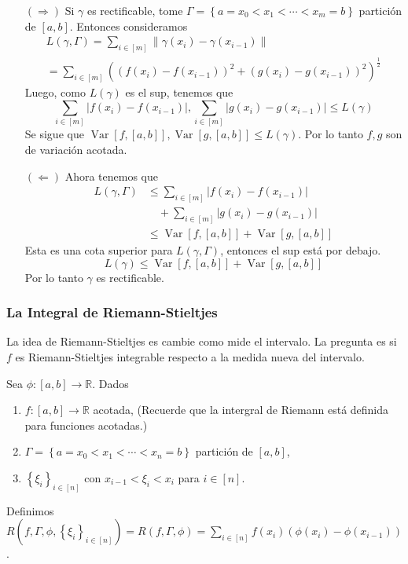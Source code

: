 \documentclass[12pt]{article}
\theoremstyle{plain}
\theoremstyle{definition}
\theoremstyle{remark}
\numberwithin{equation}{section}
\DeclareMathOperator{\Var}{Var}     %
\newcommand{\bR}{\mathbb{R}}        %
\renewcommand{\leq}{\leqslant}      %
\renewcommand{\:}{\colon}           %
\newcommand{\conj}[1]{\left\lbrace#1\right\rbrace}
\newcommand{\bonj}[1]{\left\lbrack#1\right\rbrack}
\newcommand{\nm}[1]{\left\|#1\right\|} %
\begin{document}
\begin{multicols}{2}
\begin{ptcb}
\begin{enumerate}
  \item[$(\Rightarrow)$] Si $\gamma$ es rectificable, tome $\Gamma=\conj{a=x_0<x_1<\cdots<x_m=b}$ partición de $\bonj{a,b}$. Entonces consideramos
      \begin{gather*}
        L(\gamma,\Gamma)=\sum_{i\in\bonj{m}}\nm{\gamma(x_i)-\gamma(x_{i-1})}\\
        =\sum_{i\in\bonj{m}}\left((f(x_i)-f(x_{i-1}))^2+(g(x_i)-g(x_{i-1}))^2\right)^{\frac{1}{2}}
      \end{gather*}
      Luego, como $L(\gamma)$ es el sup, tenemos que
      $$\sum_{i\in\bonj{m}}|f(x_i)-f(x_{i-1})|,\sum_{i\in\bonj{m}}|g(x_i)-g(x_{i-1})|\leq L(\gamma)$$
      Se sigue que $\Var\bonj{f,\bonj{a,b}},\Var\bonj{g,\bonj{a,b}}\leq L(\gamma)$. Por lo tanto $f,g$ son de variación acotada.
  \item[$(\Leftarrow)$] Ahora tenemos que
  \begin{align*}
   L(\gamma,\Gamma)& \leq \sum_{i\in\bonj{m}}|f(x_i)-f(x_{i-1})|\\
   &\quad+\sum_{i\in\bonj{m}}|g(x_i)-g(x_{i-1})|\\
   &\leq \Var\bonj{f,\bonj{a,b}}+\Var\bonj{g,\bonj{a,b}}
  \end{align*}
  Esta es una cota superior para $L(\gamma,\Gamma)$, entonces el sup está por debajo.
  $$L(\gamma)\leq \Var\bonj{f,\bonj{a,b}}+\Var\bonj{g,\bonj{a,b}}$$
  Por lo tanto $\gamma$ es rectificable.
\end{enumerate}
\end{ptcb}
\subsubsection*{La Integral de Riemann-Stieltjes}
La idea de Riemann-Stieltjes es cambie como mide el intervalo. La pregunta es si $f$ es Riemann-Stieltjes integrable respecto a la medida nueva del intervalo.\par
Sea $\phi\:\bonj{a,b}\to\bR$. Dados
\begin{enumerate}
  \item $f\:\bonj{a,b}\to\bR$ acotada, (Recuerde que la intergral de Riemann está definida para funciones acotadas.)
  \item $\Gamma=\conj{a=x_0<x_1<\cdots<x_n=b}$ partición de $\bonj{a,b}$,
  \item $\conj{\xi_i}_{i\in\bonj{n}}$ con $x_{i-1}<\xi_i<x_i$ para $i\in\bonj{n}$.
\end{enumerate}
Definimos $R(f,\Gamma,\phi,\conj{\xi_i}_{i\in\bonj{n}})=R(f,\Gamma,\phi)=\sum_{i\in\bonj{n}}f(x_i)(\phi(x_i)-\phi(x_{i-1}))$.


\end{multicols}
\end{document}
